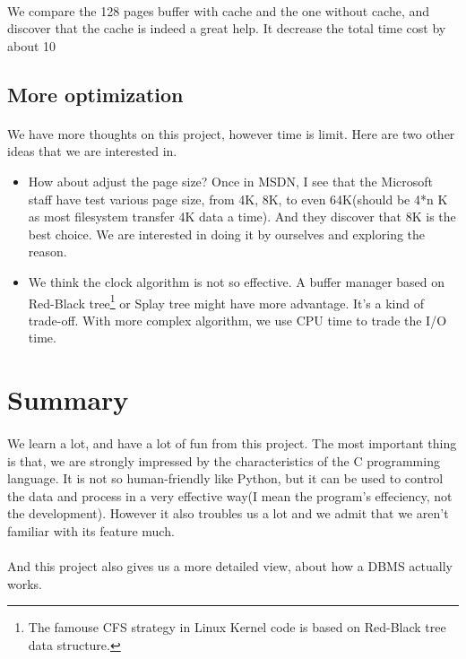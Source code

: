 \documentclass{article}
\begin{document}
        \paragraph{}
            We compare the 128 pages buffer with cache and the one without cache, and discover that the cache is indeed a great help. It decrease the total time cost by about 10%
    \subsection{More optimization}
        \paragraph{}
            We have more thoughts on this project, however time is limit. Here are two other ideas that we are interested in.
        \begin{itemize}
            \item How about adjust the page size? Once in MSDN, I see that the Microsoft staff have test various page size, from 4K, 8K, to even 64K(should be 4*n K as most filesystem transfer 4K data a time). And they discover that 8K is the best choice. We are interested in doing it by ourselves and exploring the reason.
            \item We think the clock algorithm is not so effective. A buffer manager based on Red-Black tree\footnote{The famouse CFS strategy in Linux Kernel code is based on Red-Black tree data structure.} or Splay tree might have more advantage. It's a kind of trade-off. With more complex algorithm, we use CPU time to trade the I/O time.
        \end{itemize}
\section{Summary}
    \paragraph{}
        We learn a lot, and have a lot of fun from this project. The most important thing is that, we are strongly impressed by the characteristics of the C programming language. It is not so human-friendly like Python, but it can be used to control the data and process in a very effective way(I mean the program's effeciency, not the development). However it also troubles us a lot and we admit that we aren't familiar with its feature much.
    \paragraph{}
        And this project also gives us a more detailed view, about how a DBMS actually works.
\end{document}
